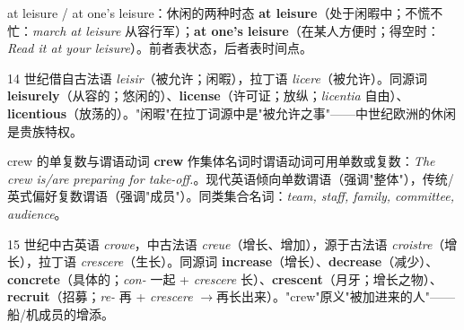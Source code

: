 \documentclass[../main.tex]{subfiles}
\begin{document}


\begin{gram}{at leisure / at one's leisure：休闲的两种时态}
\textbf{at leisure}（处于闲暇中；不慌不忙：\textit{march at leisure} 从容行军）；\textbf{at one's leisure}（在某人方便时；得空时：\textit{Read it at your leisure}）。前者表状态，后者表时间点。
\end{gram}

\begin{origin}
14 世纪借自古法语 \textit{leisir}（被允许；闲暇），拉丁语 \textit{licere}（被允许）。同源词 \textbf{leisurely}（从容的；悠闲的）、\textbf{license}（许可证；放纵；\textit{licentia} 自由）、\textbf{licentious}（放荡的）。"闲暇"在拉丁词源中是"被允许之事"——中世纪欧洲的休闲是贵族特权。
\end{origin}




\begin{gram}{crew 的单复数与谓语动词}
\textbf{crew} 作集体名词时谓语动词可用单数或复数：\textit{The crew is/are preparing for take-off.}。现代英语倾向单数谓语（强调"整体"），传统/英式偏好复数谓语（强调"成员"）。同类集合名词：\textit{team, staff, family, committee, audience}。
\end{gram}

\begin{origin}
15 世纪中古英语 \textit{crowe}，中古法语 \textit{creue}（增长、增加），源于古法语 \textit{croistre}（增长），拉丁语 \textit{crescere}（生长）。同源词 \textbf{increase}（增长）、\textbf{decrease}（减少）、\textbf{concrete}（具体的；\textit{con-} 一起 + \textit{crescere} 长）、\textbf{crescent}（月牙；增长之物）、\textbf{recruit}（招募；\textit{re-} 再 + \textit{crescere} $\to$再长出来）。"crew"原义"被加进来的人"——船/机成员的增添。
\end{origin}
\end{document}
